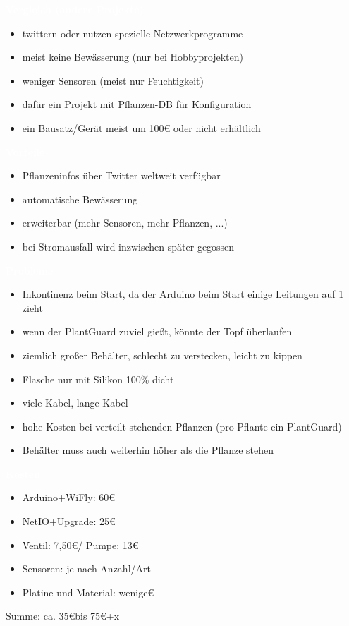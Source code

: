 \documentclass[bigger]{beamer}
\newcommand{\topic}[1]{{\huge{\textcolor{white}{\textbf{#1}}}}}
\begin{document}
\begin{frame}{\topic{Vergleich (andere Projekte)}}
	\begin{itemize}
		\item twittern oder nutzen spezielle Netzwerkprogramme
		\item meist keine Bewässerung (nur bei Hobbyprojekten)
		\item weniger Sensoren (meist nur Feuchtigkeit)
		\item dafür ein Projekt mit Pflanzen-DB für Konfiguration
		\item ein Bausatz/Gerät meist um {100\euro} oder nicht erhältlich
	\end{itemize}
\end{frame}

\begin{frame}{\topic{Vorteile}}
	\begin{itemize}
		\item Pflanzeninfos über Twitter weltweit verfügbar
		\item automatische Bewässerung
		\item erweiterbar (mehr Sensoren, mehr Pflanzen, ...)
		\item bei Stromausfall wird inzwischen später gegossen
	\end{itemize}
\end{frame}

\begin{frame}{\topic{Probleme}}
	\begin{itemize}
		\item Inkontinenz beim Start, da der Arduino beim Start einige Leitungen auf 1 zieht
		\item wenn der PlantGuard zuviel gießt, könnte der Topf überlaufen
		\item ziemlich großer Behälter, schlecht zu verstecken, leicht zu kippen
		\item Flasche nur mit Silikon 100\% dicht
		\item viele Kabel, lange Kabel
		\item hohe Kosten bei verteilt stehenden Pflanzen (pro Pflante ein PlantGuard)
		\item Behälter muss auch weiterhin höher als die Pflanze stehen
	\end{itemize}
\end{frame}

\begin{frame}{\topic{Kosten}}
	\begin{itemize}
		\item Arduino+WiFly: 60\euro
		\item NetIO+Upgrade: 25\euro
		\item Ventil: 7,50\euro / Pumpe: 13\euro
		\item Sensoren: je nach Anzahl/Art
		\item Platine und Material: wenige\euro
	\end{itemize}
	Summe: ca. 35\euro  bis 75\euro  +x
\end{frame}
\end{document}

